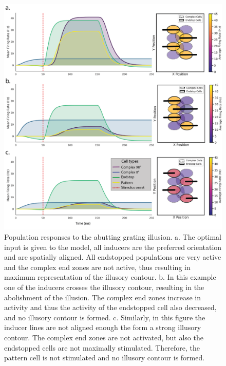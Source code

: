 \documentclass[12pt]{article}
\begin{document}
\begin{figure}[H]
  \centering
  \includegraphics[width=1.0 \textwidth]{adjusted_figures/Figure_Population.png}
  \caption{Population responses to the abutting grating illusion. a. The optimal input is given to the model, all inducers are the preferred orientation and are spatially aligned. All endstopped populations are very active and the complex end zones are not active, thus resulting in maximum representation of the illusory contour. b. In this example one of the inducers crosses the illusory contour, resulting in the abolishment of the illusion. The complex end zones increase in activity and thus the activity of the endstopped cell also decreased, and no illusory contour is formed. c. Similarly, in this figure the inducer lines are not aligned enough the form a strong illusory contour. The complex end zones are not activated, but also the endstopped cells are not maximally stimulated. Therefore, the pattern cell is not stimulated and no illusory contour is formed.}
  \label{fig:population_contours}
\end{figure}

\newpage
\end{document}
